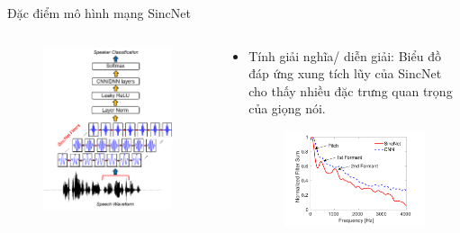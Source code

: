 \documentclass[11pt]{beamer}
\begin{document}
\begin{frame}{Đặc điểm mô hình mạng SincNet}
	\begin{columns}
		\begin{column}{0.47\textwidth}
			\begin{figure}[H]
				\includegraphics[width=0.9\linewidth]{images/SincNet.png}
			\end{figure}
		\end{column}
		\begin{column}{0.5\textwidth}
			\begin{itemize}
				\item Tính giải nghĩa/ diễn giải: Biểu đồ đáp ứng xung tích lũy của SincNet cho thấy nhiều đặc trưng quan trọng của giọng nói. 
				\begin{figure}[H]
					\includegraphics[width=0.9\linewidth]{images/interpretability.png}
				\end{figure}
			\end{itemize}
		\end{column}
	\end{columns}
\end{frame}
\end{document}
